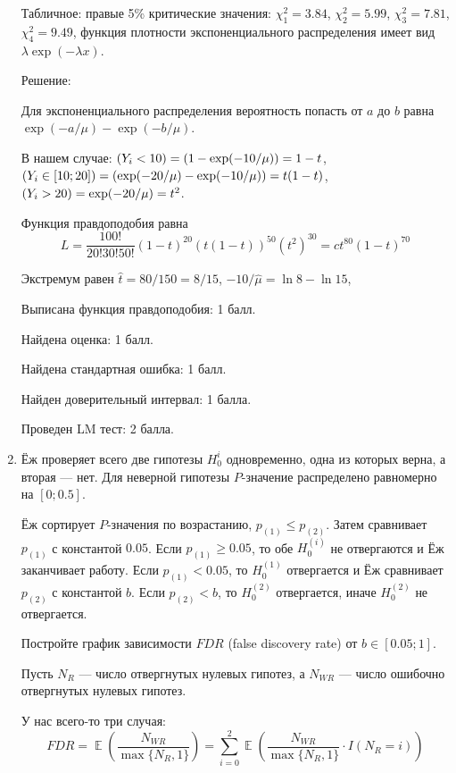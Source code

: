 \documentclass[12pt]{article}
\let\P\relax
\DeclareMathOperator{\P}{\mathbb{P}}
\DeclareMathOperator{\E}{\mathbb{E}}
\begin{document}
\begin{enumerate}
Табличное: правые 5\% критические значения: $\chi^2_1 = 3.84$, $\chi^2_2 = 5.99$, $\chi^2_3 = 7.81$, $\chi^2_4=9.49$,
функция плотности экспоненциального распределения имеет вид $\lambda \exp(-\lambda x)$.

Решение:

Для экспоненциального распределения вероятность попасть от $a$ до $b$ равна $\exp(-a/\mu) - \exp(-b/\mu)$.

В нашем случае: $\P(Y_i < 10) = (1 - \exp(-10/\mu)) = 1 - t$, $\P(Y_i \in [10;20]) = (\exp(-20/\mu) - \exp(-10/\mu)) = t(1-t)$,
$\P(Y_i > 20) = \exp(-20/\mu) = t^2$. 

Функция правдоподобия равна
\[
L = \frac{100!}{20!30!50!} (1-t)^{20} (t(1-t))^{50}(t^2)^{30} = c t^{80}(1-t)^{70}
\]

Экстремум равен $\hat t = 80/150=8/15$, $-10/\hat \mu = \ln 8 - \ln 15$, 


Выписана функция правдоподобия: 1 балл.

Найдена оценка: 1 балл.

Найдена стандартная ошибка: 1 балл.

Найден доверительный интервал: 1 балла. 

Проведен LM тест: 2 балла. 


\item Ёж проверяет всего две гипотезы $H_0^i$ одновременно, одна из которых верна, а вторая — нет. 
Для неверной гипотезы $P$-значение распределено равномерно на $[0;0.5]$.

Ёж сортирует $P$-значения по возрастанию, $p_{(1)} \leq p_{(2)}$. Затем сравнивает $p_{(1)}$ с константой $0.05$.
Если $p_{(1)} \geq 0.05$, то обе $H_0^{(i)}$ не отвергаются и Ёж заканчивает работу. 
Если $p_{(1)} < 0.05$, то $H_0^{(1)}$ отвергается и Ёж сравнивает $p_{(2)}$ с константой $b$. 
Если $p_{(2)} < b$, то $H_0^{(2)}$ отвергается, иначе $H_0^{(2)}$ не отвергается.

Постройте график зависимости $FDR$ (false discovery rate) от $b \in [0.05;1]$.

Пусть $N_R$ — число отвергнутых нулевых гипотез, а $N_{WR}$ — число ошибочно отвергнутых нулевых гипотез.


У нас всего-то три случая:
\[
FDR = \E\left(\frac{N_{WR}}{\max\{N_R, 1\}} \right)  =  \sum_{i=0}^2\E\left(\frac{N_{WR}}{\max\{N_R, 1\}} \cdot I(N_{R} = i)\right) 
\]


\end{enumerate}
\end{document}
